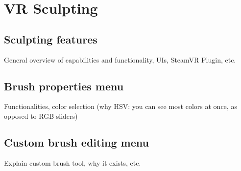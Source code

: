 \section{VR Sculpting}

\subsection{Sculpting features}
General overview of capabilities and functionality, UIs, SteamVR Plugin, etc.

\subsection{Brush properties menu}
Functionalities, color selection (why HSV: you can see most colors at once, as opposed to RGB sliders)

\subsection{Custom brush editing menu}
Explain custom brush tool, why it exists, etc.